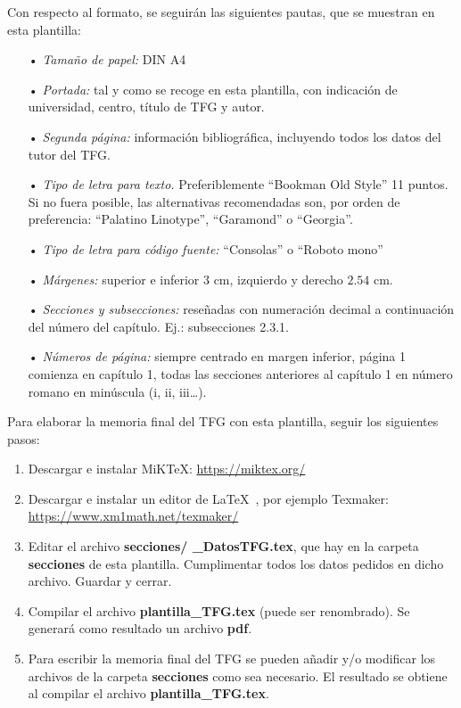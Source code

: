 Con respecto al formato, se seguirán las siguientes pautas, que se muestran en esta plantilla:
\begin{itemize}
\item[•] \textit{Tamaño de papel:} DIN A4
\item[•] \textit{Portada:} tal y como se recoge en esta plantilla, con indicación de universidad, centro, título de TFG y autor.
\item[•] \textit{Segunda página:} información bibliográfica, incluyendo todos los datos del tutor del TFG.
\item[•] \textit{Tipo de letra para texto.} Preferiblemente “Bookman Old Style” 11 puntos. Si no fuera posible, las alternativas recomendadas son, por orden de preferencia: “Palatino Linotype”, “Garamond” o “Georgia”.
\item[•] \textit{Tipo de letra para código fuente:} “Consolas” o “Roboto mono”
\item[•] \textit{Márgenes:} superior e inferior $3$ cm, izquierdo y derecho $2.54$ cm.
\item[•] \textit{Secciones y subsecciones:} reseñadas con numeración decimal a continuación del número del capítulo. Ej.: subsecciones 2.3.1.
\item[•] \textit{Números de página:} siempre centrado en margen inferior, página 1 comienza en capítulo 1, todas las secciones anteriores al capítulo 1 en número romano en minúscula (i, ii, iii…).
\end{itemize}

\vspace*{1.5cm}
Para elaborar la memoria final del TFG con esta plantilla, seguir los siguientes pasos:
\begin{enumerate}
\item Descargar e instalar MiKTeX:  \url{https://miktex.org/}
\item Descargar e instalar un editor de \LaTeX~, por ejemplo Texmaker:\\
\url{https://www.xm1math.net/texmaker/}

\item Editar el archivo \textbf{secciones/ \_DatosTFG.tex}, que hay en la carpeta \textbf{secciones} de esta plantilla. Cumplimentar todos los datos pedidos en dicho archivo. Guardar y cerrar.
\item Compilar el archivo \textbf{plantilla\_TFG.tex} (puede ser renombrado). Se generará como resultado un archivo \textbf{pdf}.
\item Para escribir la memoria final del TFG se pueden añadir y/o modificar los archivos de la carpeta \textbf{secciones} como sea necesario. El resultado se obtiene al compilar el archivo \textbf{plantilla\_TFG.tex}. 
\end{enumerate}

